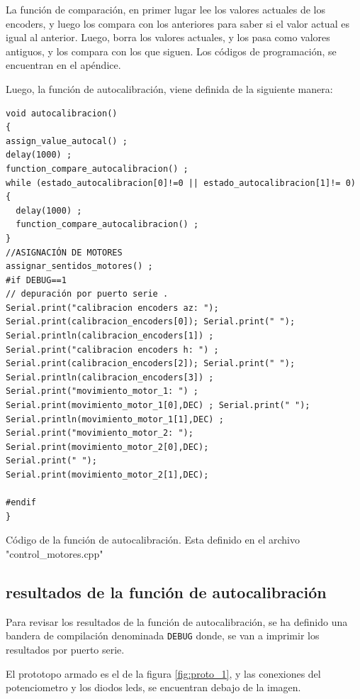 La función de comparación, en primer lugar lee los valores actuales de los encoders, y luego los compara con los anteriores para saber si el valor actual es igual al anterior. Luego, borra los valores actuales, y los pasa como valores antiguos, y los compara con los que siguen. Los códigos de programación, se encuentran en el apéndice.  

Luego, la función de autocalibración, viene definida de la siguiente manera: 

\begin{listing}[h]
	\begin{verbatim}
void autocalibracion()
{
assign_value_autocal() ;
delay(1000) ; 
function_compare_autocalibracion() ; 
while (estado_autocalibracion[0]!=0 || estado_autocalibracion[1]!= 0)
{
  delay(1000) ;     
  function_compare_autocalibracion() ;             
}
//ASIGNACIÓN DE MOTORES 
assignar_sentidos_motores() ; 
#if DEBUG==1
// depuración por puerto serie . 
Serial.print("calibracion encoders az: ");                   
Serial.print(calibracion_encoders[0]); Serial.print(" ");
Serial.println(calibracion_encoders[1]) ;
Serial.print("calibracion encoders h: ") ;
Serial.print(calibracion_encoders[2]); Serial.print(" ");
Serial.println(calibracion_encoders[3]) ;
Serial.print("movimiento_motor_1: ") ; 
Serial.print(movimiento_motor_1[0],DEC) ; Serial.print(" "); 
Serial.println(movimiento_motor_1[1],DEC) ;
Serial.print("movimiento_motor_2: ");
Serial.print(movimiento_motor_2[0],DEC); 
Serial.print(" ");
Serial.print(movimiento_motor_2[1],DEC); 			

#endif    	
}
\end{verbatim}
\caption{Código de la función de autocalibración. Esta definido en el archivo "control\_motores.cpp"}
\label{cod:autocalibracion}

\end{listing}

\subsection{resultados de la función de autocalibración}

Para revisar los resultados de la función de autocalibración, se ha definido una bandera de compilación denominada \texttt{DEBUG} donde, se van a imprimir los resultados por puerto serie. 

El prototopo armado es el de la figura \ref{fig:proto_1}, y las conexiones del potenciometro y los diodos leds, se encuentran debajo de la imagen.  
%

